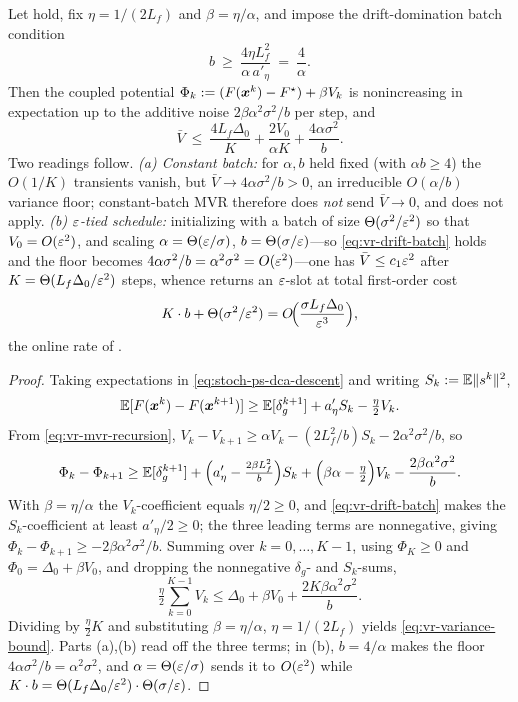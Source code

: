 \begin{proposition}
\label{prop:vr-reduced-rate}
Let  hold, fix $\eta=1/(2L_f)$ and $\beta=\eta/\alpha$, and
impose the drift-domination batch condition
\begin{equation}
    b\ \ge\ \frac{4\eta L_f^2}{\alpha\,a'_\eta}\ =\ \frac4\alpha .
    \label{eq:vr-drift-batch}
\end{equation}
Then the coupled potential $\Phi_k:=(F(\bm{x}^k)-F^\star)+\beta V_k$ is nonincreasing
in expectation up to the additive noise $2\beta\alpha^2\sigma^2/b$ per step, and
\begin{equation}
    \bar V\ \le\ \frac{4L_f\Delta_0}{K}
                +\frac{2V_0}{\alpha K}
                +\frac{4\alpha\sigma^2}{b}.
    \label{eq:vr-variance-bound}
\end{equation}
Two readings follow. \emph{(a) Constant batch:} for $\alpha,b$ held fixed (with
$\alpha b\ge4$) the $O(1/K)$ transients vanish, but $\bar V\to4\alpha\sigma^2/b>0$,
an irreducible $O(\alpha/b)$ variance floor; constant-batch MVR therefore does
\emph{not} send $\bar V\to0$, and  does not apply.
\emph{(b) $\varepsilon$-tied schedule:} initializing with a batch of size
$\Theta(\sigma^2/\varepsilon^2)$ so that $V_0=O(\varepsilon^2)$, and scaling
$\alpha=\Theta(\varepsilon/\sigma)$, $b=\Theta(\sigma/\varepsilon)$---so
\eqref{eq:vr-drift-batch} holds and the floor becomes
$4\alpha\sigma^2/b=\alpha^2\sigma^2=O(\varepsilon^2)$---one has $\bar V\le c_1\varepsilon^2$
after $K=\Theta(L_f\Delta_0/\varepsilon^2)$ steps, whence 
returns an $\varepsilon$-slot at total first-order cost
\[
    K\cdot b+\Theta(\sigma^2/\varepsilon^2)
    =O\!\Bigl(\frac{\sigma L_f\Delta_0}{\varepsilon^3}\Bigr),
\]
the online rate of \citet{chayti2025stochastic}.
\end{proposition}

\begin{proof}
Taking expectations in \eqref{eq:stoch-ps-dca-descent} and writing
$S_k:=\mathbb{E}\lVert s^k\rVert^2$,
\[
    \mathbb{E}[F(\bm{x}^k)-F(\bm{x}^{k+1})]
    \ge\mathbb{E}[\delta_g^{k+1}]+a'_\eta S_k-\tfrac\eta2 V_k .
\]
From \eqref{eq:vr-mvr-recursion},
$V_k-V_{k+1}\ge\alpha V_k-(2L_f^2/b)S_k-2\alpha^2\sigma^2/b$, so
\[
    \Phi_k-\Phi_{k+1}
    \ge\mathbb{E}[\delta_g^{k+1}]
      +\Bigl(a'_\eta-\tfrac{2\beta L_f^2}{b}\Bigr)S_k
      +\Bigl(\beta\alpha-\tfrac\eta2\Bigr)V_k
      -\frac{2\beta\alpha^2\sigma^2}{b}.
\]
With $\beta=\eta/\alpha$ the $V_k$-coefficient equals $\eta/2\ge0$, and
\eqref{eq:vr-drift-batch} makes the $S_k$-coefficient at least $a'_\eta/2\ge0$;
the three leading terms are nonnegative, giving
$\Phi_k-\Phi_{k+1}\ge-2\beta\alpha^2\sigma^2/b$. Summing over $k=0,\dots,K-1$,
using $\Phi_K\ge0$ and $\Phi_0=\Delta_0+\beta V_0$, and dropping the nonnegative
$\delta_g$- and $S_k$-sums,
\[
    \tfrac\eta2\sum_{k=0}^{K-1}V_k
    \le\Delta_0+\beta V_0+\frac{2K\beta\alpha^2\sigma^2}{b}.
\]
Dividing by $\tfrac\eta2 K$ and substituting $\beta=\eta/\alpha$, $\eta=1/(2L_f)$
yields \eqref{eq:vr-variance-bound}. Parts (a),(b) read off the three terms; in
(b), $b=4/\alpha$ makes the floor $4\alpha\sigma^2/b=\alpha^2\sigma^2$, and
$\alpha=\Theta(\varepsilon/\sigma)$ sends it to $O(\varepsilon^2)$ while
$K\cdot b=\Theta(L_f\Delta_0/\varepsilon^2)\cdot\Theta(\sigma/\varepsilon)$.
\end{proof}

